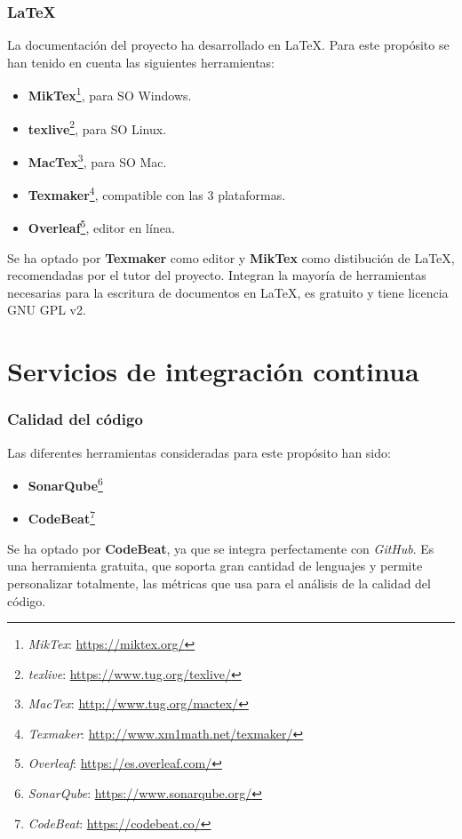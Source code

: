 \subsubsection{\LaTeX}
La documentación del proyecto ha desarrollado en \LaTeX. Para este propósito se han tenido en cuenta las siguientes herramientas:
\begin{itemize}
\item \textbf{MikTex}\footnote{\textsl{MikTex}: \url{https://miktex.org/}}, para SO Windows.
\item \textbf{texlive}\footnote{\textsl{texlive}: \url{https://www.tug.org/texlive/}}, para SO Linux.
\item \textbf{MacTex}\footnote{\textsl{MacTex}: \url{http://www.tug.org/mactex/}}, para SO Mac.
\item \textbf{Texmaker}\footnote{\textsl{Texmaker}: \url{http://www.xm1math.net/texmaker/}}, compatible con las 3 plataformas.
\item \textbf{Overleaf}\footnote{\textsl{Overleaf}: \url{ https://es.overleaf.com/}}, editor en línea.
\end{itemize}

Se ha optado por \textbf{Texmaker} como editor y \textbf{MikTex} como distibución de \LaTeX, recomendadas por el tutor del proyecto.
Integran la mayoría de herramientas necesarias para la escritura de documentos en \LaTeX, es gratuito y tiene licencia GNU GPL v2.

\section{Servicios de integración continua}


\subsubsection{Calidad del código}
Las diferentes herramientas consideradas para este propósito han sido: 
\begin{itemize}
\item \textbf{SonarQube}\footnote{\textsl{SonarQube}: \url{https://www.sonarqube.org/}}
\item \textbf{CodeBeat}\footnote{\textsl{CodeBeat}: \url{https://codebeat.co/}}
\end{itemize}

Se ha optado por \textbf{CodeBeat}, ya que se integra perfectamente con \emph{GitHub}. Es una herramienta gratuita, que soporta gran cantidad de lenguajes y permite personalizar totalmente, las métricas que usa para el análisis de la calidad del código.

